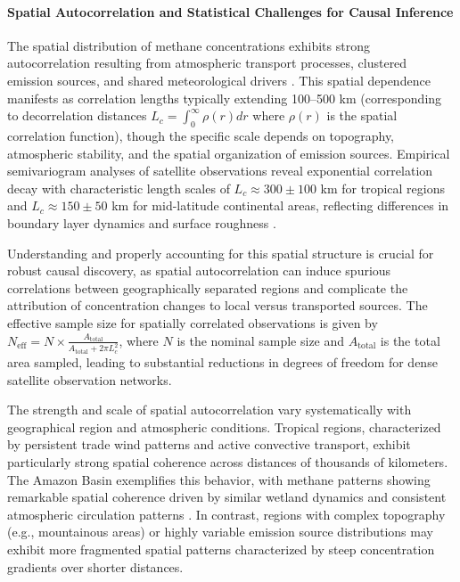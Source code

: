 \paragraph{Spatial Autocorrelation and Statistical Challenges for Causal Inference}
The spatial distribution of methane concentrations exhibits strong autocorrelation resulting from atmospheric transport processes, clustered emission sources, and shared meteorological drivers \cite{Feng2017}. This spatial dependence manifests as correlation lengths typically extending 100--500 km (corresponding to decorrelation distances $L_c = \int_0^{\infty} \rho(r) dr$ where $\rho(r)$ is the spatial correlation function), though the specific scale depends on topography, atmospheric stability, and the spatial organization of emission sources. Empirical semivariogram analyses of satellite  observations reveal exponential correlation decay with characteristic length scales of $L_c \approx 300 \pm 100$ km for tropical regions and $L_c \approx 150 \pm 50$ km for mid-latitude continental areas, reflecting differences in boundary layer dynamics and surface roughness \cite{Feng2017}.

Understanding and properly accounting for this spatial structure is crucial for robust causal discovery, as spatial autocorrelation can induce spurious correlations between geographically separated regions and complicate the attribution of concentration changes to local versus transported sources. The effective sample size for spatially correlated observations is given by $N_{\text{eff}} = N \times \frac{A_{\text{total}}}{A_{\text{total}} + 2\pi L_c^2}$, where $N$ is the nominal sample size and $A_{\text{total}}$ is the total area sampled, leading to substantial reductions in degrees of freedom for dense satellite observation networks.

The strength and scale of spatial autocorrelation vary systematically with geographical region and atmospheric conditions. Tropical regions, characterized by persistent trade wind patterns and active convective transport, exhibit particularly strong spatial coherence across distances of thousands of kilometers. The Amazon Basin exemplifies this behavior, with methane patterns showing remarkable spatial coherence driven by similar wetland dynamics and consistent atmospheric circulation patterns \cite{feng_tropical_2022}. In contrast, regions with complex topography (e.g., mountainous areas) or highly variable emission source distributions may exhibit more fragmented spatial patterns characterized by steep concentration gradients over shorter distances.

